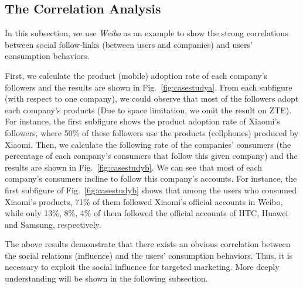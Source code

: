 \documentclass{llncs}
\begin{document}
\subsection{The Correlation Analysis}
\vspace*{-0.3cm}
In this subsection, we use \emph{Weibo} as an example to show the strong correlations between social follow-links (between users and companies) and users' consumption behaviors.

First, we calculate the product (mobile) adoption rate of each company's followers and the results are shown in Fig.~\ref{fig:casestudya}. From each subfigure (with respect to one company), we could observe that most of the followers adopt each company's products (Due to space limitation, we omit the result on ZTE). For instance, the first subfigure shows the product adoption rate of Xiaomi's followers, where 50\% of these followers use the products (cellphones) produced by Xiaomi. Then, we calculate the following rate of the companies' consumers (the percentage of each company's consumers that follow this given company) and the results are shown in Fig.~\ref{fig:casestudyb}. We can see that most of each company's consumers incline to follow this company's accounts. For instance, the first subfigure of Fig.~\ref{fig:casestudyb} shows that among the users who consumed Xiaomi's products, 71\% of them followed Xiaomi's official accounts in Weibo, while only 13\%, 8\%, 4\% of them followed the official accounts of HTC, Huawei and Samsung, respectively.

The above results demonstrate that there exists an obvious correlation between the social relations (influence) and the users' consumption behaviors. Thus, it is necessary to exploit the social influence for targeted marketing. More deeply understanding will be shown in the following subsection.
\end{document}
